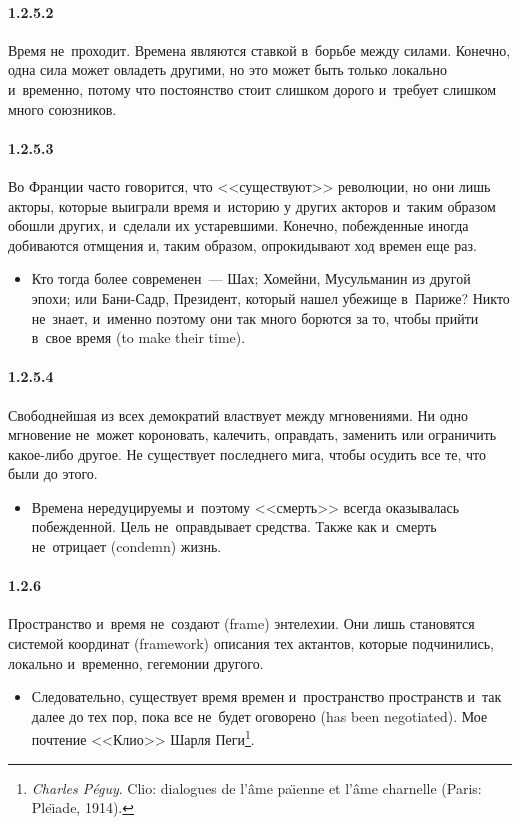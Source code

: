 \paragraph{1.2.5.2}\hypertarget{par:1.2.5.2}{} Время не~проходит. Времена являются ставкой в~борьбе между силами. Конечно, одна сила может овладеть другими, но это может быть только локально и~временно, потому что постоянство стоит слишком дорого и~требует слишком много союзников.

\paragraph{1.2.5.3}\hypertarget{par:1.2.5.3}{} Во Франции часто говорится, что <<существуют>> революции, но они лишь акторы, которые выиграли время и~историю у других акторов и~таким образом обошли других, и~сделали их устаревшими. Конечно, побежденные иногда добиваются отмщения и, таким образом, опрокидывают ход времен еще раз.
	\begin{itemize}
	\item Кто тогда более современен~--- Шах; Хомейни, Мусульманин из другой эпохи; или Бани-Садр, Президент, который нашел убежище в~Париже? Никто не~знает, и~именно поэтому они так много борются за то, чтобы прийти в~свое время (to make their time).
	\end{itemize}

\paragraph{1.2.5.4}\hypertarget{par:1.2.5.4}{} Свободнейшая из всех демократий властвует между мгновениями. Ни одно мгновение не~может короновать, калечить, оправдать, заменить или ограничить какое-либо другое. Не существует последнего мига, чтобы осудить все те, что были до этого.
	\begin{itemize}
	\item Времена нередуцируемы и~поэтому <<смерть>> всегда оказывалась побежденной. Цель не~оправдывает средства. Также как и~смерть не~отрицает (condemn) жизнь.
	\end{itemize}

\paragraph{1.2.6}\hypertarget{par:1.2.6}{} Пространство и~время не~создают (frame) энтелехии. Они лишь становятся системой координат (framework) описания тех актантов, которые подчинились, локально и~временно, гегемонии другого. 
	\begin{itemize}
	\item Следовательно, существует время времен и~пространство пространств и~так далее до тех пор, пока все не~будет оговорено (has been negotiated). Мое почтение <<Клио>> Шарля Пеги\footnote{{\itshape Charles P{\'e}guy}. Clio: dialogues de l'{\^a}me pa{\"\i}enne et l'{\^a}me charnelle (Paris: Ple{\"\i}ade, 1914).}.
	\end{itemize}

